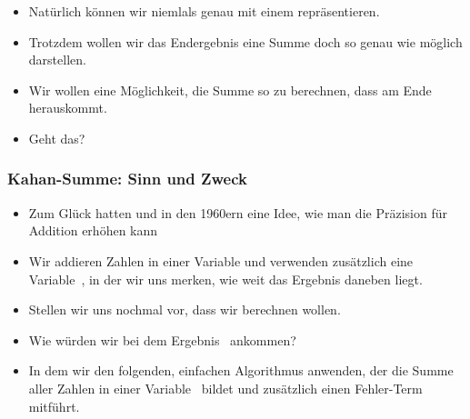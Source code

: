 \documentclass[aspectratio=169,mathserif,notheorems]{beamer}%
\begin{document}
\begin{frame}[t]
{{\begin{itemize}
{}%
%
%
%
%
%
%
%
\item<32-> Natürlich können wir  niemlals genau mit einem  repräsentieren.%
%
\item<33-> Trotzdem wollen wir das Endergebnis eine Summe doch so genau wie möglich darstellen.%
%
\item<34-> Wir wollen eine Möglichkeit, die Summe  so zu berechnen, dass am Ende  herauskommt.%
%
\item<35-> Geht das?%
\end{itemize}%
}}%
%
%
%
\end{frame}%
%
\begin{frame}%
\frametitle{Kahan-Summe: Sinn und Zweck}%
\begin{itemize}%
%
\item Zum Glück hatten \citeauthor{K1965PFRORTE}\cite{K1965PFRORTE} und \citeauthor{B1968NSIMA}\cite{B1968NSIMA} in den 1960ern eine Idee, wie man die Präzision für Addition erhöhen kann\cite{G1991WECSSKAFPA,L2020RWECSSKAFPA}%
%
\item<2-> Wir addieren Zahlen in einer Variable  und verwenden zusätzlich eine Variable~, in der wir uns merken, wie weit das Ergebnis daneben liegt.%
%
\item<3-> Stellen wir uns nochmal vor, dass wir  berechnen wollen.%
%
\item<4-> Wie würden wir bei dem Ergebnis~ ankommen?
%
\item<5-> In dem wir den folgenden, einfachen Algorithmus anwenden, der die Summe aller Zahlen in einer Variable~ bildet und zusätzlich einen Fehler-Term~ mitführt.
\end{itemize}%
\end{frame}%
%
\end{document}
